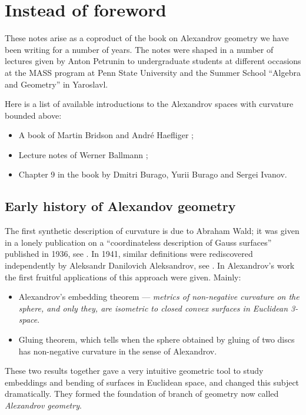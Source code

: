 \mainmatter

\chapter*{Instead of foreword}

These notes arise as a coproduct of the book on Alexandrov geometry
we have been writing for  a number of years.
The notes were shaped in a number of lectures given by Anton Petrunin 
to undergraduate students 
at different  occasions at the
MASS program at Penn State University
and the Summer School ``Algebra and Geometry'' in Yaroslavl.

Here is a list of available introductions to the Alexandrov spaces with curvature bounded above: 
\begin{itemize}
\item A book of Martin Bridson and Andr\'e Haefliger \cite{BH};
\item Lecture notes of Werner Ballmann \cite{ballmann:lectures};
\item Chapter 9 in the book \cite{BBI} by Dmitri Burago, Yurii Burago and Sergei Ivanov.
\end{itemize}

\section*{Early history of Alexandov geometry}

The first synthetic description of curvature is due to Abraham Wald; 
it was given in a lonely publication on a ``coordinateless description of Gauss surfaces'' published in 1936, see \cite{wald}.
In 1941, similar definitions were rediscovered independently by Aleksandr Danilovich Aleksandrov,
see \cite{alexandrov:def}.
In Alexandrov's work the first fruitful applications of this approach were given.
Mainly:
\begin{itemize}
\item Alexandrov's embedding theorem  --- 
\textit{metrics of non-negative curvature on the sphere, and only they, are isometric to closed convex surfaces in Euclidean 3-space}. 
\item Gluing theorem, which tells when the sphere obtained by gluing of two discs has non-negative curvature in the sense of Alexandrov.
\end{itemize}
These two results together gave  a very intuitive geometric tool to study embeddings and bending of surfaces in Euclidean space, and changed this subject dramatically.
They formed the foundation of branch of geometry now called \emph{Alexandrov geometry}.

